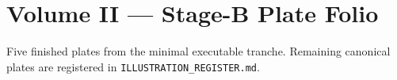 \documentclass[11pt,openany]{book}
\begin{document}
\frontmatter
\chapter*{Volume II — Stage-B Plate Folio}
Five finished plates from the minimal executable tranche. Remaining canonical plates are registered in \texttt{ILLUSTRATION\_REGISTER.md}.
\mainmatter





\end{document}
